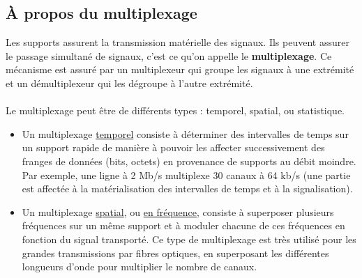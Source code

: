 \documentclass[12pt,a4paper]{report}
\begin{document}
\subsection{À propos du multiplexage}
Les supports assurent la transmission matérielle des signaux. Ils peuvent assurer le passage simultané de signaux, c'est ce qu'on appelle le \textbf{multiplexage}. Ce mécanisme est assuré par un multiplexeur qui groupe les signaux à une extrémité et un démultiplexeur qui les dégroupe à l'autre extrémité.\\
\\
Le multiplexage peut être de différents types : temporel, spatial, ou statistique.
\begin{itemize}
\item Un multiplexage \underline{temporel} consiste à déterminer des intervalles de temps sur un support rapide de manière à pouvoir les affecter successivement  des franges de données (bits, octets) en provenance de supports au débit moindre. Par exemple, une ligne à 2 Mb/s multiplexe 30 canaux à 64 kb/s (une partie est affectée à la matérialisation des intervalles de temps et à la signalisation).
\item  Un multiplexage \underline{spatial}, ou \underline{en fréquence},  consiste à superposer plusieurs fréquences sur un même support et à moduler chacune de ces fréquences en fonction du signal transporté. Ce type de multiplexage est très utilisé pour les grandes transmissions par fibres optiques, en superposant les différentes longueurs d'onde pour multiplier le nombre de canaux.
\end{itemize}
 
\end{document}
